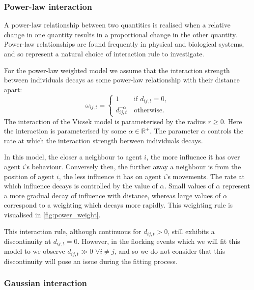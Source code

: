 \subsubsection{Power-law interaction}

A power-law relationship between two quantities is realised when a relative
change in one quantity results in a proportional change in the other quantity.
Power-law relationships are found frequently in physical and biological
systems, and so represent a natural choice of interaction rule to investigate.

For the power-law weighted model we assume that the interaction strength
between individuals decays as some power-law relationship with their distance
apart:
\begin{equation}
  \label{eq:power_law_interaction}
  \omega_{ij,t} =
  \begin{cases}
    1                  & \, \text{if } d_{ij,t} = 0, \\
	d_{ij,t}^{-\alpha} & \, \text{otherwise}.
  \end{cases}
\end{equation}
The interaction of the Vicsek model is parameterised by the radius $r \geq 0$.
Here the interaction is parameterised by some $\alpha\in\mathbb{R}^+$. The
parameter $\alpha$ controls the rate at which the interaction strength between
individuals decays. 

In this model, the closer a neighbour to agent $i$, the more influence it has
over agent $i$'s behaviour. Conversely then, the further away a neighbour is
from the position of agent $i$, the less influence it has on agent $i$'s
movements. The rate at which influence decays is controlled by the value of
$\alpha$. Small values of $\alpha$ represent a more gradual decay of influence
with distance, whereas large values of $\alpha$ correspond to a weighting which
decays more rapidly. This weighting rule is visualised in
\cref{fig:power_weight}.

This interaction rule, although continuous for $d_{ij,t} > 0$, still exhibits a
discontinuity at $d_{ij,t}=0$. However, in the flocking events which we will
fit this model to we observe $d_{ij,t}\gg0$ $\forall i \neq j$, and so we do
not consider that this discontinuity will pose an issue during the fitting
process.

\subsubsection{Gaussian interaction}

